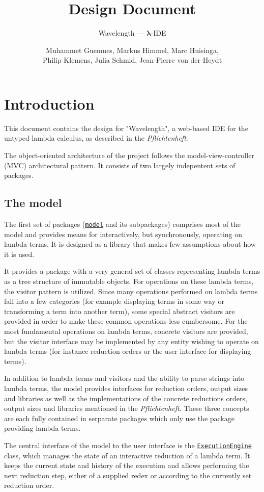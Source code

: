 \documentclass[a4paper, parskip=half]{scrartcl}
\title{Design Document}
\subtitle{Wavelength --- $\bm{\lambda}$-IDE}
\author{Muhammet Guemues, Markus Himmel, Marc Huisinga,\\Philip Klemens, Julia Schmid, Jean-Pierre von der Heydt}
\newcommand{\pkglnk}[1]{\hyperref[pkg:edu.kit.wavelength.client.#1]{#1}}
\begin{document}
\maketitle
\thispagestyle{empty}
\newpage
\tableofcontents
\newpage
\section{Introduction}

This document contains the design for "Wavelength", a web-based IDE for the untyped
lambda calculus, as described in the \textit{Pflichtenheft}.

The object-oriented architecture of the project follows the model-view-controller (MVC)
architectural pattern. It consists of two largely indepentent sets of packages.

\subsection{The model}

The first set of packages (\texttt{\pkglnk{model}} and its subpackages) comprises most of the model and provides means for interactively, but
synchronously, operating on lambda terms. It is designed as a library that makes few
assumptions about how it is used.

It provides a package with a very general set of classes representing
lambda terms as a tree structure of immutable objects. For operations on these lambda
terms, the visitor pattern is utilized. Since many operations performed on lambda terms
fall into a few categories (for example displaying terms in some way or transforming a term
into another term), some special abstract visitors are provided in order to make these common
operations less cumbersome. For the most fundamental operations on lambda terms, concrete
visitors are provided, but the visitor interface may be implemented by any entity wishing
to operate on lambda terms (for instance reduction orders or the user interface for displaying
terms).

In addition to lambda terms and visitors and the ability to parse strings into
lambda terms, the model provides interfaces for reduction orders,
output sizes and libraries as well as the implementations of the concrete reductions orders,
output sizes and libraries mentioned in the \textit{Pflichtenheft}. These three
concepts are each fully contained in serparate packages which only use the package
providing lambda terms.

The central interface of the model to the user interface is the
\texttt{\hyperref[type:edu.kit.wavelength.client.model.ExecutionEngine]{ExecutionEngine}}
class, which manages the state of an interactive reduction of a lambda term. It
keeps the current state and history of the execution and allows performing the next
reduction step, either of a supplied redex or according to the currently set reduction
order.
\end{document}

